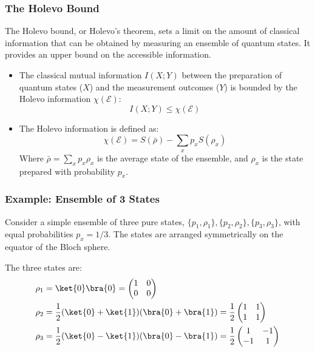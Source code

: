 \begin{frame}
    \frametitle{The Holevo Bound}

    The Holevo bound, or Holevo's theorem, sets a limit on the amount of classical information that can be obtained by measuring an ensemble of quantum states. It provides an upper bound on the accessible information.

    \vspace{0.2cm}

    \begin{itemize}
        \item The classical mutual information $I(X; Y)$ between the preparation of quantum states ($X$) and the measurement outcomes ($Y$) is bounded by the Holevo information $\chi(\mathcal{E})$:
              \begin{equation*}
                  I(X; Y) \le \chi(\mathcal{E})
              \end{equation*}

        \item The Holevo information is defined as:
              \begin{equation*}
                  \chi(\mathcal{E}) = S(\bar{\rho}) - \sum_x p_x S(\rho_x)
              \end{equation*}
              Where $\bar{\rho} = \sum_x p_x \rho_x$ is the average state of the ensemble, and $\rho_x$ is the state prepared with probability $p_x$.
    \end{itemize}

\end{frame}

\begin{frame}
    \frametitle{Example: Ensemble of 3 States}

    Consider a simple ensemble of three pure states, $\{p_1, \rho_1\}, \{p_2, \rho_2\}, \{p_3, \rho_3\}$, with equal probabilities $p_x = 1/3$. The states are arranged symmetrically on the equator of the Bloch sphere.

    \vspace{0.2cm}

    The three states are:
    \begin{align*}
        \rho_1 & = \ket{0}\bra{0} = \begin{pmatrix} 1 & 0 \\ 0 & 0 \end{pmatrix}                                             \\
        \rho_2 & = \frac{1}{2}(\ket{0}+\ket{1})(\bra{0}+\bra{1}) = \frac{1}{2}\begin{pmatrix} 1 & 1 \\ 1 & 1 \end{pmatrix}   \\
        \rho_3 & = \frac{1}{2}(\ket{0}-\ket{1})(\bra{0}-\bra{1}) = \frac{1}{2}\begin{pmatrix} 1 & -1 \\ -1 & 1 \end{pmatrix}
    \end{align*}

\end{frame}

